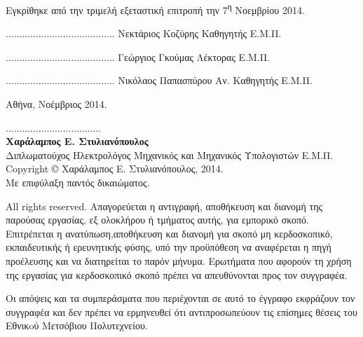 \documentclass[12pt, twoside, a4paper]{report}
\begin{document}
\noindent
Εγκρίθηκε από την τριμελή εξεταστική επιτροπή την 7\textsuperscript{η} Νοεμβρίου 2014.

\begin{center}
\scriptsize
\parbox[b]{0.3\textwidth} {\center
	........................................
	Νεκτάριος Κοζύρης
	Καθηγητής Ε.Μ.Π.
}
\parbox[b]{0.3\textwidth} {\center
	........................................
	Γεώργιος Γκούμας
	Λέκτορας Ε.Μ.Π.
}
\parbox[b]{0.3\textwidth} {\center
	........................................
	Νικόλαος Παπασπύρου
	Αν. Καθηγητής Ε.Μ.Π.
}
\end{center}
\vspace{10ex}
\normalsize
\noindent
Αθήνα, Νοέμβριος 2014.
\newpage
\hspace{10pt}

\vspace{30ex}
\noindent
................................... \\
\textbf{Χαράλαμπος Ε. Στυλιανόπουλος} \\
Διπλωματούχος Ηλεκτρολόγος Μηχανικός και Μηχανικός Υπολογιστών Ε.Μ.Π. \\
\vfill
\noindent
\textlatin{Copyright} © Χαράλαμπος Ε. Στυλιανόπουλος, 2014.\\
Με επιφύλαξη παντός δικαιώματος.\\

\bigskip


\noindent
\textlatin{All rights reserved}. Απαγορεύεται η αντιγραφή, αποθήκευση και διανομή της παρούσας εργασίας, εξ ολοκλήρου ή τμήματος αυτής, για εμπορικό σκοπό. Επιτρέπεται η ανατύπωση,αποθήκευση και διανομή για σκοπό μη κερδοσκοπικό, εκπαιδευτικής ή ερευνητικής φύσης, υπό την προϋπόθεση να αναφέρεται η πηγή προέλευσης και να διατηρείται το παρόν μήνυμα. Ερωτήματα που αφορούν τη χρήση της εργασίας για κερδοσκοπικό σκοπό πρέπει να απευθύνονται προς τον συγγραφέα.\\

\bigskip

\noindent Οι απόψεις και τα συμπεράσματα που περιέχονται σε αυτό το έγγραφο εκφράζουν τον συγγραφέα και δεν πρέπει να ερμηνευθεί ότι αντιπροσωπεύουν τις επίσημες θέσεις του Εθνικoύ Μετσόβιου Πολυτεχνείου. \\
\vspace{8ex}

%
%
\newpage

\clearpage\null\newpage

\clearpage\null\newpage

\clearpage\null\newpage
{} %
\tableofcontents
\listoffigures
\lstlistoflistings
\end{document}
